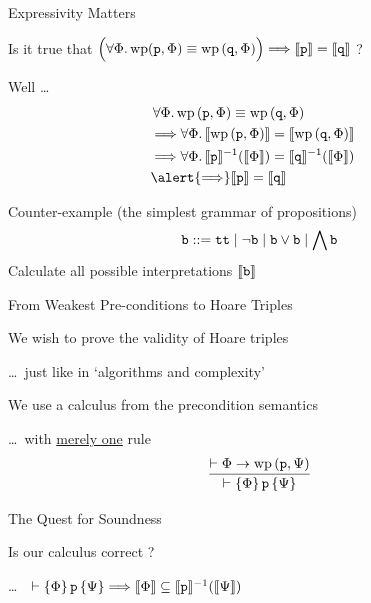 \documentclass{beamer}
\begin{document}
\begin{frame}{Expressivity Matters}

Is it true that $\Big ( \forall \Phi. \, \mathrm{wp}(\mathtt{p}, \Phi)
\equiv \mathrm{wp} \,(\mathtt{q}, \Phi) \Big ) \Longrightarrow \llbracket \mathtt{p} \rrbracket =
\llbracket \mathtt{q} \rrbracket$ ? 

\pause
\bigskip
Well \dots
\vspace{-0.3cm}
\begin{align*}
        & \, \forall \Phi. \, \mathrm{wp} \, (\prog{p}, \Phi) \equiv \mathrm{wp} \, (\prog{q}, \Phi)
        \\
        & \Longrightarrow 
        \forall \Phi. \, \sem{\mathrm{wp} \, (\prog{p}, \Phi)} = \sem{\mathrm{wp} \, (\prog{q}, \Phi)}
        \\
        & \Longrightarrow 
        \forall \Phi. \, \sem{\prog{p}}^{-1}(\sem{\Phi}) = \sem{\prog{q}}^{-1}(\sem{\Phi}) 
        &
        \\
        & \alert{\Longrightarrow} 
        \sem{\prog{p}} = \sem{\prog{q}} 
\end{align*}
\pause
\vspace{-0.7cm}
\begin{block}{Counter-example (the simplest grammar of propositions) }
        \[
                \mathtt{b} :: = \mathtt{tt} \mid \mathtt{\neg b} \mid \mathtt{b \vee b}
                \mid \bigwedge \mathtt{b}
        \]
        Calculate all possible interpretations $\llbracket \mathtt{b} \rrbracket$
\end{block}
\end{frame}

\begin{frame}{From Weakest Pre-conditions to Hoare Triples}

        We wish to prove the validity of Hoare triples

        \dots \, just like in `algorithms and complexity'

        \bigskip
        We use a calculus from the precondition semantics

        \dots \, with  \alert{\underline{merely one}} rule
        \[
                \infer{\vdash \{ \Phi \} \, \prog{p} \, \{ \Psi \}}
                { \vdash \Phi \rightarrow \mathrm{wp} \, (\prog{p}, \Psi) }
        \]
\end{frame}

\begin{frame}{The Quest for Soundness}

        Is our calculus correct ?

        \dots \, \ie\  $\vdash \{ \Phi \} \, \mathtt{p} \, \{ \Psi \} \Longrightarrow
        \llbracket \Phi \rrbracket \subseteq \llbracket \mathtt{p} \rrbracket^{-1}(\llbracket \Psi \rrbracket)$

        \pause
        \bigskip
        \bigskip
        \begin{center}
        \end{center}
\end{frame}
\end{document}
